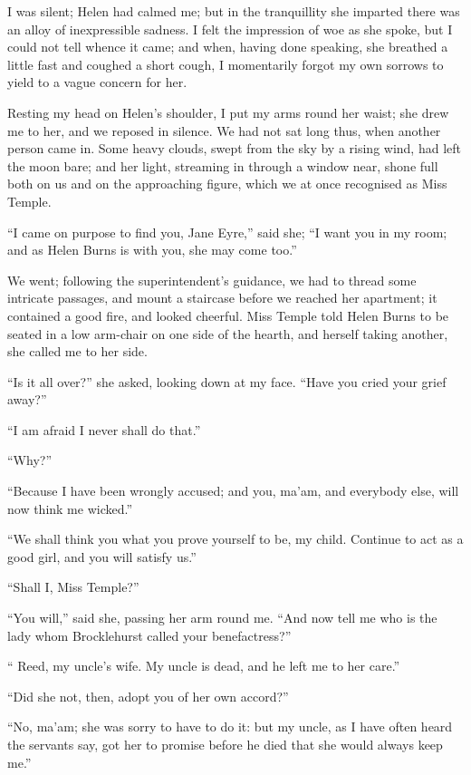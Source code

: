I was silent; Helen had calmed me; but in the tranquillity she imparted
there was an alloy of inexpressible sadness. I felt the impression of
woe as she spoke, but I could not tell whence it came; and when, having
done speaking, she breathed a little fast and coughed a short cough, I
momentarily forgot my own sorrows to yield to a vague concern for her.

Resting my head on Helen's shoulder, I put my arms round her waist; she
drew me to her, and we reposed in silence. We had not sat long thus,
when another person came in. Some heavy clouds, swept from the sky by a
rising wind, had left the moon bare; and her light, streaming in through
a window near, shone full both on us and on the approaching figure,
which we at once recognised as Miss Temple.

\enquote{I came on purpose to find you, Jane Eyre,} said she; \enquote{I
	want you in my room; and as Helen Burns is with you, she may come too.}

We went; following the superintendent's guidance, we had to thread some
intricate passages, and mount a staircase before we reached her
apartment; it contained a good fire, and looked cheerful. Miss Temple
told Helen Burns to be seated in a low arm-chair on one side of the
hearth, and herself taking another, she called me to her side.

\enquote{Is it all over?} she asked, looking down at my face.
\enquote{Have you cried your grief away?}

\enquote{I am afraid I never shall do that.}

\enquote{Why?}

\enquote{Because I have been wrongly accused; and you, ma'am, and
	everybody else, will now think me wicked.}

\enquote{We shall think you what you prove yourself to be, my child.
	Continue to act as a good girl, and you will satisfy us.}

\enquote{Shall I, Miss Temple?}

\enquote{You will,} said she, passing her arm round me. \enquote{And
	now tell me who is the lady whom \Mr{} Brocklehurst called your
	benefactress?}

\enquote{\Mrs{} Reed, my uncle's wife. My uncle is dead, and he left me
	to her care.}

\enquote{Did she not, then, adopt you of her own accord?}

\enquote{No, ma'am; she was sorry to have to do it: but my uncle, as I
	have often heard the servants say, got her to promise before he died
	that she would always keep me.}

